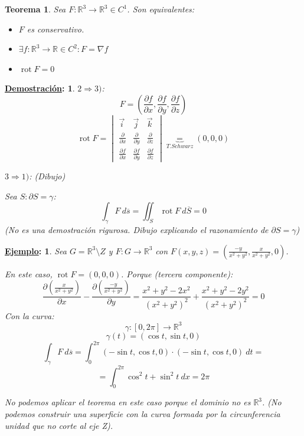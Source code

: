 \documentclass[10pt,a4paper,openright]{book}
\theoremstyle{break}
\newtheorem*{theo}{Teorema}
\newtheorem*{demo}{\underline{Demostración}:}
\newtheorem*{ej}{\underline{Ejemplo}:}
\DeclareMathOperator{\rot}{rot}
\newcommand{\dif}[1]{\ d#1}
\begin{document}
\begin{theo}
Sea $F: \mathbb{R}^3 \rightarrow \mathbb{R}^3 \in C^1$. Son equivalentes: 
\begin{itemize}
    \item $F$ es conservativo.
    \item $\exists f: \mathbb{R}^3 \rightarrow \mathbb{R} \in C^2: F = \nabla f$ 
    \item $\rot F = 0$
\end{itemize}
\end{theo}
\begin{demo}
$2 \Rightarrow 3)$: 
$$F = \left( \frac{\partial f}{\partial x}, \frac{\partial f}{\partial y}, \frac{\partial f}{\partial z} \right)$$
$$\rot F = \begin{vmatrix} \vec{i} & \vec{j} & \vec{k} \\
\frac{\partial }{\partial x} & \frac{\partial }{\partial y} & \frac{\partial }{\partial z} \\
\frac{\partial f}{\partial x} & \frac{\partial f}{\partial y} & \frac{\partial f}{\partial z} \end{vmatrix} \underbrace{=}_{T. Schwarz} \left( 0, 0, 0 \right)$$

$3 \Rightarrow 1)$: 
(\textit{Dibujo})

Sea $S : \partial S = \gamma$: 
$$\int_{\gamma} F \dif{\overline{s}} = \iint_{S} \rot F \dif{\overline{S}} = 0$$
(No es una demostración rigurosa. \textit{Dibujo explicando el razonamiento de $\partial S = \gamma$})
\end{demo}

\begin{ej}
Sea $G = \mathbb{R}^3 \setminus Z$ y $F: G \rightarrow \mathbb{R}^3$ con $F\left( x, y, z \right) = \left( \frac{-y}{x^2 + y^2}, \frac{x}{x^2 + y^2}, 0 \right)$. 

En este caso, $\rot F = \left( 0, 0, 0 \right)$. Porque (tercera componente): 
$$\frac{\partial \left( \frac{x}{x^2 + y^2} \right)}{\partial x} - \frac{\partial \left( \frac{-y}{x^2 + y^2} \right)}{\partial y} = \frac{x^2 + y^2 - 2x^2}{\left( x^2 + y^2 \right)^2} + \frac{x^2 + y^2 - 2y^2}{\left( x^2 + y^2 \right)^2} = 0$$
Con la curva: 
$$\gamma: \left[ 0, 2\pi \right] \rightarrow \mathbb{R}^3$$
$$\gamma\left( t \right) = \left( \cos t, \sin t, 0 \right)$$
$$\int_{\gamma} F \dif{\overline{s}} = \int_{0}^{2\pi} \left( -\sin t, \cos t, 0 \right) \cdot \left( -\sin t, \cos t, 0 \right) \dif{t} = $$
$$= \int_{0}^{2\pi} \cos^2 t + \sin^2t \dif{x} = 2\pi$$

No podemos aplicar el teorema en este caso porque el dominio no es $\mathbb{R}^3$. (No podemos construir una superficie con la curva formada por la circunferencia unidad que no corte al eje Z).
\end{ej}
\end{document}
